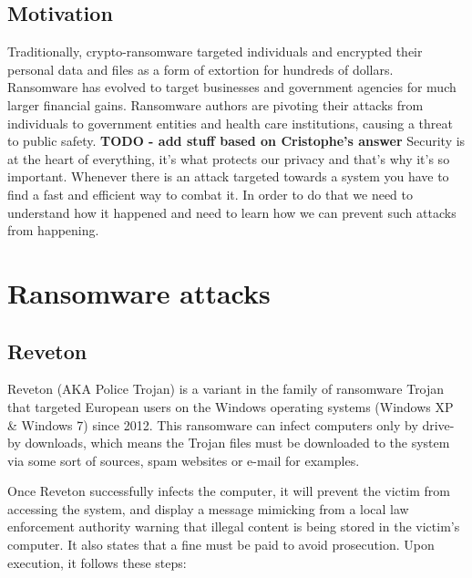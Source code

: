 \documentclass[10pt,a4paper]{article}
\begin{document}
\subsection{Motivation}
Traditionally, crypto-ransomware targeted individuals and encrypted their personal data and files as a form of extortion for hundreds of dollars. Ransomware has evolved to target businesses and government agencies for much larger financial gains. Ransomware authors are pivoting their attacks from individuals to government entities and health care institutions, causing a threat to public safety. \textbf{TODO - add stuff based on Cristophe's answer} Security is at the heart of everything, it's what protects our privacy and that's why it's so important. Whenever there is an attack targeted towards a system you have to find a fast and efficient way to combat it. In order to do that we need to understand how it happened and need to learn how we can prevent such attacks from happening.

\section{Ransomware attacks}

\subsection{Reveton}
Reveton (AKA Police Trojan) is a variant in the family of ransomware Trojan that targeted European users on the Windows operating systems (Windows XP \& Windows 7) since 2012. This ransomware can infect computers only by drive-by downloads, which means the Trojan files must be downloaded to the system via some sort of sources, spam websites or e-mail for examples.

Once Reveton successfully infects the computer, it will prevent the victim from accessing the system, and display a message mimicking from a local law enforcement authority warning that illegal content is being stored in the victim’s computer. It also states that a fine must be paid to avoid prosecution.
Upon execution, it follows these steps:
\end{document}
